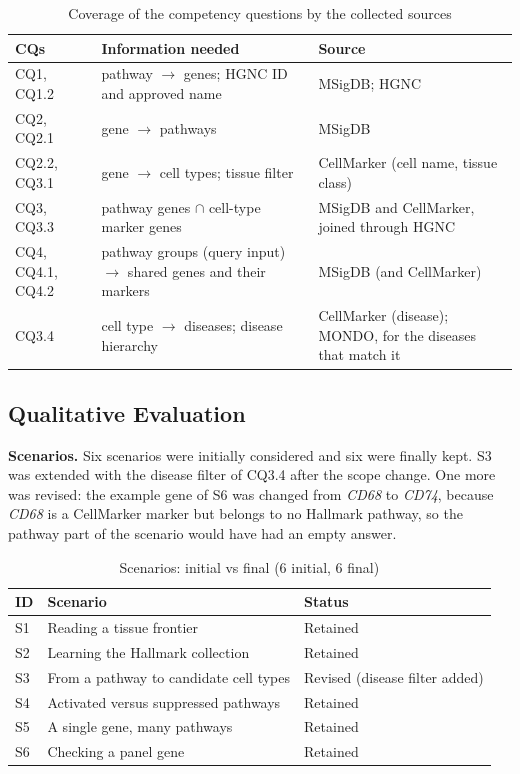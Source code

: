 \begin{table}[htbp]
\centering
\small
\begin{tabularx}{\linewidth}{|l|X|X|}
\hline
\textbf{CQs} & \textbf{Information needed} & \textbf{Source} \\ \hline
CQ1, CQ1.2 & pathway $\rightarrow$ genes; HGNC ID and approved name & MSigDB; HGNC \\ \hline
CQ2, CQ2.1 & gene $\rightarrow$ pathways & MSigDB \\ \hline
CQ2.2, CQ3.1 & gene $\rightarrow$ cell types; tissue filter & CellMarker (cell name, tissue class) \\ \hline
CQ3, CQ3.3 & pathway genes $\cap$ cell-type marker genes & MSigDB and CellMarker, joined through HGNC \\ \hline
CQ4, CQ4.1, CQ4.2 & pathway groups (query input) $\rightarrow$ shared genes and their markers & MSigDB (and CellMarker) \\ \hline
CQ3.4 & cell type $\rightarrow$ diseases; disease hierarchy & CellMarker (disease); MONDO, for the diseases that match it \\ \hline
\end{tabularx}
\caption{Coverage of the competency questions by the collected sources}
\label{tab:coverage}
\end{table}

\subsection{Qualitative Evaluation}
\label{sec:qual-eval}

\medskip\noindent\textbf{Scenarios.} Six scenarios were initially considered and six were finally kept. S3 was extended with the disease filter of CQ3.4 after the scope change. One more was revised: the example gene of S6 was changed from \emph{CD68} to \emph{CD74}, because \emph{CD68} is a CellMarker marker but belongs to no Hallmark pathway, so the pathway part of the scenario would have had an empty answer.

\begin{table}[htbp]
\centering
\small
\begin{tabularx}{\linewidth}{|l|X|l|}
\hline
\textbf{ID} & \textbf{Scenario} & \textbf{Status} \\ \hline
S1 & Reading a tissue frontier & Retained \\ \hline
S2 & Learning the Hallmark collection & Retained \\ \hline
S3 & From a pathway to candidate cell types & Revised (disease filter added) \\ \hline
S4 & Activated versus suppressed pathways & Retained \\ \hline
S5 & A single gene, many pathways & Retained \\ \hline
S6 & Checking a panel gene & Retained \\ \hline
\end{tabularx}
\caption{Scenarios: initial vs final (6 initial, 6 final)}
\end{table}


